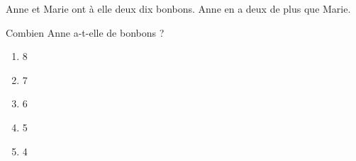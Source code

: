 Anne et Marie ont à elle deux dix bonbons. Anne en a deux de plus que Marie.
\par Combien Anne a-t-elle de bonbons ?
\begin{multicols}{5}
  \begin{enumerate}[A/]
    \item 8
    \item 7
    \item 6
    \item 5
    \item 4
  \end{enumerate}
  \end{multicols}
